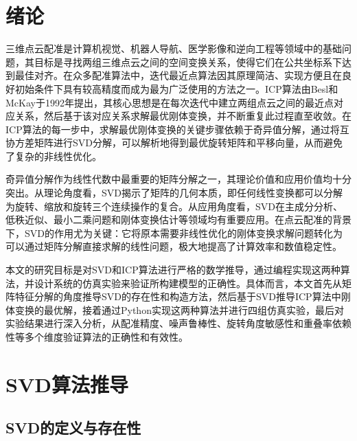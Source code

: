 \documentclass[a4paper,12pt]{ctexrep}
\begin{document}
\tableofcontents

\chapter{绪论}

三维点云配准是计算机视觉、机器人导航、医学影像和逆向工程等领域中的基础问题，其目标是寻找两组三维点云之间的空间变换关系，使得它们在公共坐标系下达到最佳对齐。在众多配准算法中，迭代最近点算法因其原理简洁、实现方便且在良好初始条件下具有较高精度而成为最为广泛使用的方法之一。ICP算法由Besl和McKay于1992年提出，其核心思想是在每次迭代中建立两组点云之间的最近点对应关系，然后基于该对应关系求解最优刚体变换，并不断重复此过程直至收敛。在ICP算法的每一步中，求解最优刚体变换的关键步骤依赖于奇异值分解，通过将互协方差矩阵进行SVD分解，可以解析地得到最优旋转矩阵和平移向量，从而避免了复杂的非线性优化。

奇异值分解作为线性代数中最重要的矩阵分解之一，其理论价值和应用价值均十分突出。从理论角度看，SVD揭示了矩阵的几何本质，即任何线性变换都可以分解为旋转、缩放和旋转三个连续操作的复合。从应用角度看，SVD在主成分分析、低秩近似、最小二乘问题和刚体变换估计等领域均有重要应用。在点云配准的背景下，SVD的作用尤为关键：它将原本需要非线性优化的刚体变换求解问题转化为可以通过矩阵分解直接求解的线性问题，极大地提高了计算效率和数值稳定性。

本文的研究目标是对SVD和ICP算法进行严格的数学推导，通过编程实现这两种算法，并设计系统的仿真实验来验证所构建模型的正确性。具体而言，本文首先从矩阵特征分解的角度推导SVD的存在性和构造方法，然后基于SVD推导ICP算法中刚体变换的最优解，接着通过Python实现这两种算法并进行四组仿真实验，最后对实验结果进行深入分析，从配准精度、噪声鲁棒性、旋转角度敏感性和重叠率依赖性等多个维度验证算法的正确性和有效性。

\chapter{SVD算法推导}

\section{SVD的定义与存在性}
\end{document}
